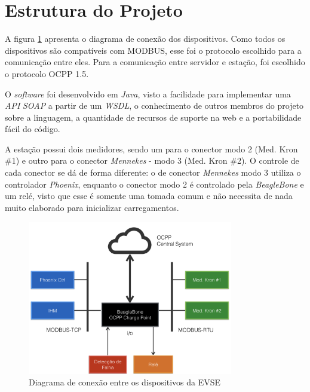   \section{Estrutura do Projeto}
  \label{methodology:structure}

    A figura \ref{fig:proj-diagram} apresenta o diagrama de conexão dos dispositivos. Como todos os dispositivos são compatíveis com MODBUS, esse foi o protocolo escolhido para a comunicação entre eles. Para a comunicação entre servidor e estação, foi escolhido o protocolo \ac{OCPP} 1.5. 

    O \textit{software} foi desenvolvido em \textit{Java}, visto a facilidade para implementar uma \textit{API} \textit{\ac{SOAP}} a partir de um \textit{\ac{WSDL}}, o conhecimento de outros membros do projeto sobre a linguagem, a quantidade de recursos de suporte na web e a portabilidade fácil do código.

    A estação possui dois medidores, sendo um para o conector modo 2 (Med. Kron \#1) e outro para o conector \textit{Mennekes} - modo 3 (Med. Kron \#2). O controle de cada conector se dá de forma diferente: o de conector \textit{Mennekes} modo 3 utiliza o controlador \textit{Phoenix}, enquanto o conector modo 2 é controlado pela \textit{BeagleBone} e um relé, visto que esse é somente uma tomada comum e não necessita de nada muito elaborado para inicializar carregamentos.

    \begin{figure}[H]
      \begin{center}
        \includegraphics[width=0.8\textwidth,natwidth=400,natheight=288]{assets/images/devices-diagram.png}
        \caption{Diagrama de conexão entre os dispositivos da EVSE}
        \label{fig:proj-diagram}
      \end{center}
    \end{figure}

